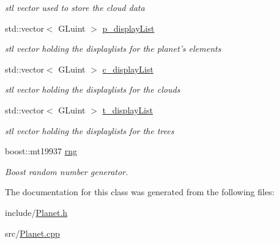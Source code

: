 \begin{DoxyCompactItemize}
\begin{DoxyCompactList}\small\item\em stl vector used to store the cloud data \item\end{DoxyCompactList}\item 
\hypertarget{classPlanet_a14a5c1a90c0b7f1f9477ede1de1db85e}{
std::vector$<$ GLuint $>$ \hyperlink{classPlanet_a14a5c1a90c0b7f1f9477ede1de1db85e}{p\_\-displayList}}
\label{classPlanet_a14a5c1a90c0b7f1f9477ede1de1db85e}

\begin{DoxyCompactList}\small\item\em stl vector holding the displaylists for the planet's elements \item\end{DoxyCompactList}\item 
\hypertarget{classPlanet_ad933cda019cd99d8179813f3e0a36be3}{
std::vector$<$ GLuint $>$ \hyperlink{classPlanet_ad933cda019cd99d8179813f3e0a36be3}{c\_\-displayList}}
\label{classPlanet_ad933cda019cd99d8179813f3e0a36be3}

\begin{DoxyCompactList}\small\item\em stl vector holding the displaylists for the clouds \item\end{DoxyCompactList}\item 
\hypertarget{classPlanet_a54967034d5e5e7f25de195f898d4de42}{
std::vector$<$ GLuint $>$ \hyperlink{classPlanet_a54967034d5e5e7f25de195f898d4de42}{t\_\-displayList}}
\label{classPlanet_a54967034d5e5e7f25de195f898d4de42}

\begin{DoxyCompactList}\small\item\em stl vector holding the displaylists for the trees \item\end{DoxyCompactList}\item 
\hypertarget{classPlanet_ae7380f1c1344ca0c662d7321eaac89c6}{
boost::mt19937 \hyperlink{classPlanet_ae7380f1c1344ca0c662d7321eaac89c6}{rng}}
\label{classPlanet_ae7380f1c1344ca0c662d7321eaac89c6}

\begin{DoxyCompactList}\small\item\em Boost random number generator. \item\end{DoxyCompactList}\end{DoxyCompactItemize}


The documentation for this class was generated from the following files:\begin{DoxyCompactItemize}
\item 
include/\hyperlink{Planet_8h}{Planet.h}\item 
src/\hyperlink{Planet_8cpp}{Planet.cpp}\end{DoxyCompactItemize}
